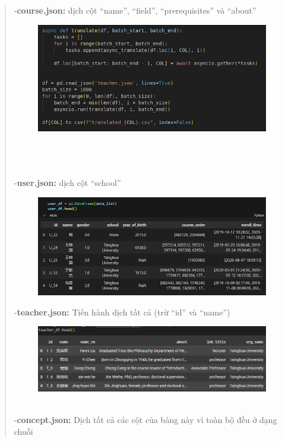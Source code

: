 \begin{quote}
-\textbf{course.json:} dịch cột “name”, “field”, “prerequisites” và “about”\\
\begin{figure}[h]
    \centering
    \includegraphics[width=1\linewidth]{figures/2.png}
\end{figure}\\
\\
\\
-\textbf{user.json:} dịch cột “school”\\
\begin{figure}[h]
    \centering
    \includegraphics[width=0.8\linewidth]{figures/3.png}
\end{figure}
\newpage
-\textbf{teacher.json:} Tiến hành dịch tất cả (trừ “id” và “name”)\\
\begin{figure}[h]
    \centering
    \includegraphics[width=1\linewidth]{figures/4.png}
\end{figure}\\
-\textbf{concept.json:} Dịch tất cả các cột của bảng này vì toàn bộ đều ở dạng chuỗi\\

\end{quote}
